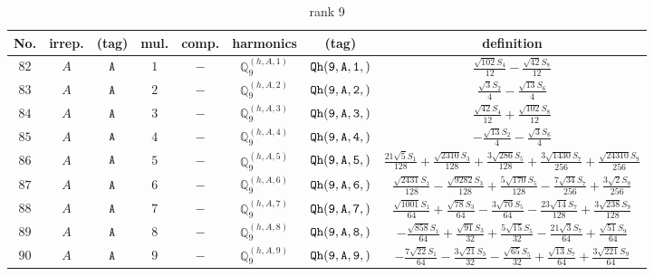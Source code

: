 \documentclass[fleqn,8pt]{jsarticle}
\begin{document}
\begin{table}[ht!]
\begin{center}
\caption{rank 9}
\renewcommand{\arraystretch}{1.3}
\begin{tabular}{cccccccc} \hline \hline
No. & irrep. & (tag) & mul. & comp. & harmonics & (tag) & definition \\ \hline
$ 82 $ & $ A $ & $ {\tt A} $ & $ 1 $ & $ - $ & $ \mathbb{Q}_{9}^{(h,A,1)} $ & $ {\tt Qh(9,A,1,)} $ & $ \frac{\sqrt{102} S_{4}}{12} - \frac{\sqrt{42} S_{8}}{12} $ \\
$ 83 $ & $ A $ & $ {\tt A} $ & $ 2 $ & $ - $ & $ \mathbb{Q}_{9}^{(h,A,2)} $ & $ {\tt Qh(9,A,2,)} $ & $ \frac{\sqrt{3} S_{2}}{4} - \frac{\sqrt{13} S_{6}}{4} $ \\
$ 84 $ & $ A $ & $ {\tt A} $ & $ 3 $ & $ - $ & $ \mathbb{Q}_{9}^{(h,A,3)} $ & $ {\tt Qh(9,A,3,)} $ & $ \frac{\sqrt{42} S_{4}}{12} + \frac{\sqrt{102} S_{8}}{12} $ \\
$ 85 $ & $ A $ & $ {\tt A} $ & $ 4 $ & $ - $ & $ \mathbb{Q}_{9}^{(h,A,4)} $ & $ {\tt Qh(9,A,4,)} $ & $ - \frac{\sqrt{13} S_{2}}{4} - \frac{\sqrt{3} S_{6}}{4} $ \\
$ 86 $ & $ A $ & $ {\tt A} $ & $ 5 $ & $ - $ & $ \mathbb{Q}_{9}^{(h,A,5)} $ & $ {\tt Qh(9,A,5,)} $ & $ \frac{21 \sqrt{5} S_{1}}{128} + \frac{\sqrt{2310} S_{3}}{128} + \frac{3 \sqrt{286} S_{5}}{128} + \frac{3 \sqrt{1430} S_{7}}{256} + \frac{\sqrt{24310} S_{9}}{256} $ \\
$ 87 $ & $ A $ & $ {\tt A} $ & $ 6 $ & $ - $ & $ \mathbb{Q}_{9}^{(h,A,6)} $ & $ {\tt Qh(9,A,6,)} $ & $ \frac{\sqrt{2431} S_{1}}{128} - \frac{\sqrt{9282} S_{3}}{128} + \frac{5 \sqrt{170} S_{5}}{128} - \frac{7 \sqrt{34} S_{7}}{256} + \frac{3 \sqrt{2} S_{9}}{256} $ \\
$ 88 $ & $ A $ & $ {\tt A} $ & $ 7 $ & $ - $ & $ \mathbb{Q}_{9}^{(h,A,7)} $ & $ {\tt Qh(9,A,7,)} $ & $ \frac{\sqrt{1001} S_{1}}{64} + \frac{\sqrt{78} S_{3}}{64} - \frac{3 \sqrt{70} S_{5}}{64} - \frac{23 \sqrt{14} S_{7}}{128} + \frac{3 \sqrt{238} S_{9}}{128} $ \\
$ 89 $ & $ A $ & $ {\tt A} $ & $ 8 $ & $ - $ & $ \mathbb{Q}_{9}^{(h,A,8)} $ & $ {\tt Qh(9,A,8,)} $ & $ - \frac{\sqrt{858} S_{1}}{64} + \frac{\sqrt{91} S_{3}}{32} + \frac{5 \sqrt{15} S_{5}}{32} - \frac{21 \sqrt{3} S_{7}}{64} + \frac{\sqrt{51} S_{9}}{64} $ \\
$ 90 $ & $ A $ & $ {\tt A} $ & $ 9 $ & $ - $ & $ \mathbb{Q}_{9}^{(h,A,9)} $ & $ {\tt Qh(9,A,9,)} $ & $ - \frac{7 \sqrt{22} S_{1}}{64} - \frac{3 \sqrt{21} S_{3}}{32} - \frac{\sqrt{65} S_{5}}{32} + \frac{\sqrt{13} S_{7}}{64} + \frac{3 \sqrt{221} S_{9}}{64} $ \\

\end{tabular}
\end{center}
\end{table}
\end{document}
